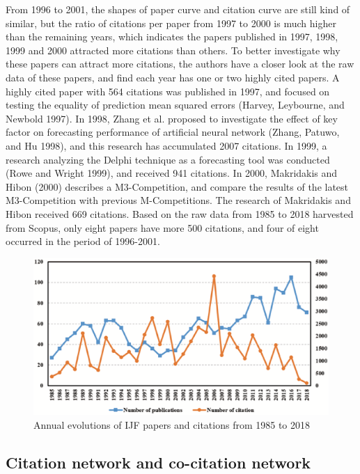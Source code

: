 \documentclass[11pt,a4paper]{elsarticle} %
\begin{document}
From 1996 to 2001, the shapes of paper curve and citation curve are
still kind of similar, but the ratio of citations per paper from 1997 to
2000 is much higher than the remaining years, which indicates the papers
published in 1997, 1998, 1999 and 2000 attracted more citations than
others. To better investigate why these papers can attract more
citations, the authors have a closer look at the raw data of these
papers, and find each year has one or two highly cited papers. A highly
cited paper with 564 citations was published in 1997, and focused on
testing the equality of prediction mean squared errors (Harvey,
Leybourne, and Newbold 1997). In 1998, Zhang et al. proposed to
investigate the effect of key factor on forecasting performance of
artificial neural network (Zhang, Patuwo, and Hu 1998), and this
research has accumulated 2007 citations. In 1999, a research analyzing
the Delphi technique as a forecasting tool was conducted (Rowe and
Wright 1999), and received 941 citations. In 2000, Makridakis and Hibon
(2000) describes a M3-Competition, and compare the results of the latest
M3-Competition with previous M-Competitions. The research of Makridakis
and Hibon received 669 citations. Based on the raw data from 1985 to
2018 harvested from Scopus, only eight papers have more 500 citations,
and four of eight occurred in the period of 1996-2001.

\begin{figure}[htbp]
\centering
\includegraphics[width=\textwidth]{fig.1.eps}
\caption{Annual evolutions of IJF papers and citations from 1985 to 2018}
\end{figure}

\subsection{Citation network and co-citation
network}\label{citation-network-and-co-citation-network}
\end{document}
